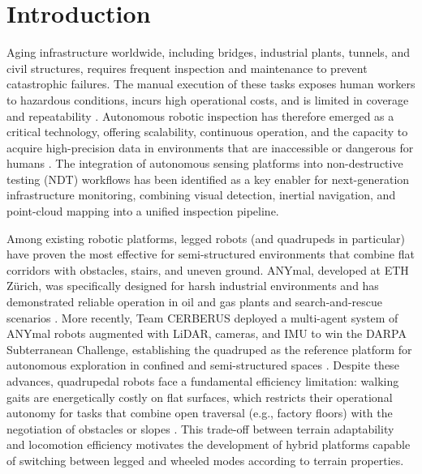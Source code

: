 \section{Introduction}
\label{sec:introduction}

Aging infrastructure worldwide, including bridges, industrial plants, tunnels, and civil structures, requires frequent inspection and maintenance to prevent catastrophic failures. The manual execution of these tasks exposes human workers to hazardous conditions, incurs high operational costs, and is limited in coverage and repeatability \citep{Halder2023Construction,Wang2025Autonomous}. Autonomous robotic inspection has therefore emerged as a critical technology, offering scalability, continuous operation, and the capacity to acquire high-precision data in environments that are inaccessible or dangerous for humans \citep{Halder2025Crack}. The integration of autonomous sensing platforms into non-destructive testing (NDT) workflows has been identified as a key enabler for next-generation infrastructure monitoring, combining visual detection, inertial navigation, and point-cloud mapping into a unified inspection pipeline.

Among existing robotic platforms, legged robots (and quadrupeds in particular) have proven the most effective for semi-structured environments that combine flat corridors with obstacles, stairs, and uneven ground. ANYmal, developed at ETH Z\"{u}rich, was specifically designed for harsh industrial environments and has demonstrated reliable operation in oil and gas plants and search-and-rescue scenarios \citep{Hutter2017ANYmal}. More recently, Team CERBERUS deployed a multi-agent system of ANYmal robots augmented with LiDAR, cameras, and IMU to win the DARPA Subterranean Challenge, establishing the quadruped as the reference platform for autonomous exploration in confined and semi-structured spaces \citep{Tranzatto2022CERBERUS}. Despite these advances, quadrupedal robots face a fundamental efficiency limitation: walking gaits are energetically costly on flat surfaces, which restricts their operational autonomy for tasks that combine open traversal (e.g., factory floors) with the negotiation of obstacles or slopes \citep{Vogel2024Ladder}. This trade-off between terrain adaptability and locomotion efficiency motivates the development of hybrid platforms capable of switching between legged and wheeled modes according to terrain properties.

